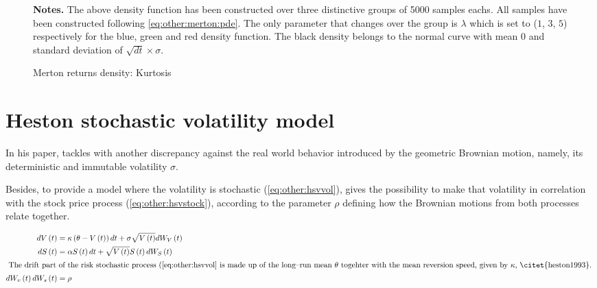 \documentclass[12pt,a4paper]{report}
\newcommand{\Bmsub}[1]{W_{#1}\left(t\right)}
\newcommand{\St}{S\left(t\right)}
\newcommand{\Vt}{V\left(t\right)}
\newcommand{\HSVstock}{
  d\St &= \alpha \St dt + \sqrt{\Vt} \St d \Bmsub{S}
}
\newcommand{\HSVvol}{
  d\Vt &= \kappa\left(\theta - \Vt \right) dt + \sigma \sqrt{\Vt} d \Bmsub{V}
}
\begin{document}
\begin{figure}[h]
\centering

\caption{Merton returns density: Kurtosis}
  \begin{changemargin}{0.5cm}{0.5cm}
  \medskip
\footnotesize
{}\textbf{Notes.} The above density function has been constructed over three distinctive groups of 5000 samples eachs. All samples have been constructed following \cref{eq:other:merton:pde}. The only parameter that changes over the group is $\lambda$ which is set to ($1$, $3$, $5$) respectively for the blue, green and red density function. The black density belongs to the normal curve with mean 0 and standard deviation of $\sqrt{dt} \times \sigma$.   
\end{changemargin}
\label{plot:MertonReturnDensityTails}
\end{figure}













\section{Heston stochastic volatility model}
\label{sec:other:heston}

In his paper, \citet{heston1993} tackles with another discrepancy against the real world behavior introduced by the geometric Brownian motion, namely, its deterministic and immutable volatility $\sigma$.

Besides, to provide a model where the volatility is stochastic (\cref{eq:other:hsvvol}), \citet{heston1993} gives the possibility to make that volatility in correlation with the stock price process (\cref{eq:other:hsvstock}), according to the parameter $\rho$ defining how the Brownian motions from both processes relate together.

\begin{align}
    \HSVvol \label{eq:other:hsvvol} \\
    \HSVstock \label{eq:other:hsvstock} \\
    \intertext{
    The drift part of the risk stochastic process (\ref{eq:other:hsvvol} is made up of the long--run mean $\theta$ togehter with the mean reversion speed, given by $\kappa$, \citet{heston1993}.
    }
    d\Bmsub{v} d\Bmsub{s} &= \rho \label{eq:other:rho}
\end{align}
\end{document}
